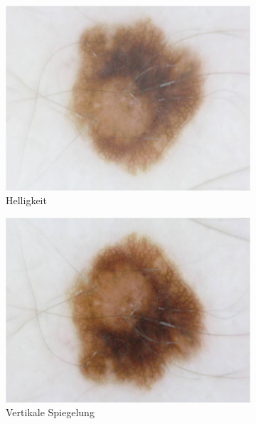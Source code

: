 \begin{figure}[t]
\begin{subfigure}[t]{0.24\linewidth}
		\includegraphics[width=\textwidth]{pics/augmentations/brightness.png}
		\caption{Helligkeit}
		\label{subfig:aug_bright}
	\end{subfigure}
	\begin{subfigure}[t]{0.24\linewidth}
		\includegraphics[width=\textwidth]{pics/augmentations/vertical_flip.png}
		\caption{Vertikale Spiegelung}
		\label{subfig:aug_v_flip}
	\end{subfigure}
	\begin{subfigure}[t]{0.24\linewidth}

\end{subfigure}
\end{figure}
